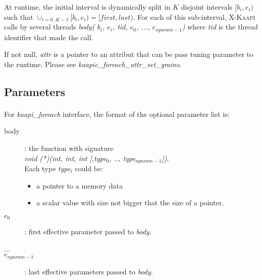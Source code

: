 \documentclass[a4paper, 11pt]{article}
\newcommand{\kaapi}{\textsc{X-Kaapi}\xspace}
\begin{document}
At runtime, the initial interval is dynamically split in $K$ disjoint intervals $[b_i, e_i)$ such that $\cup_{i=0..K-1} [b_i, e_i) = [first, last)$. For each of this sub-interval, \kaapi calls by several threads \textit{body( $b_i$, $e_i$, tid, $e_0$, ..., $e_{nparam-1}$)} where \textit{tid} is the thread identifier that made the call.

If not null, \textit{attr} is a pointer to an attribut that can be pass tuning parameter to the runtime. Please see \textit{kaapic\_foreach\_attr\_set\_grains}.
\subsection{Parameters}
\paragraph{}
For \textit{kaapi\_foreach} interface, the format of the optional parameter list is:
\begin{description}
\item [body]: the function with signature\\
\hspace*{5ex}\textit{void (*)(int, int, int [,type$_0$, .., type$_{nparam-1}$])}.\\
Each type \textit{type$_i$} could be:
\begin{itemize}
\item a pointer to a memory data
\item a scalar value with size not bigger that the size of a pointer.
\end{itemize}

\item [$e_0$]: first effective parameter passed to \textit{body}.
\item [...]
\item [$e_{nparam-1}$]: last effective parameters passed to \textit{body}.
\end{description}
\end{document}
